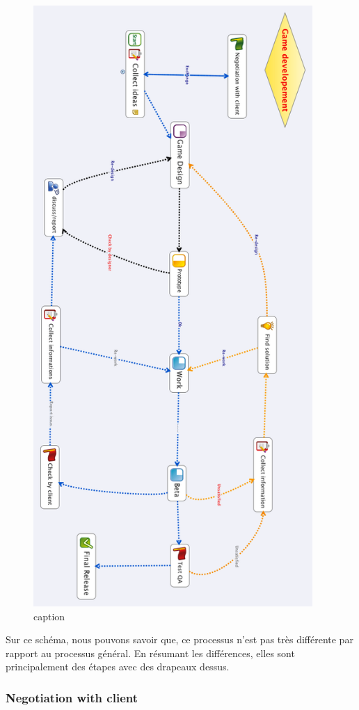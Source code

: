 \begin{figure}[htbp]
	\centering
		\includegraphics[height=9in]{XMinds/GamedevelopementChugulu.png}
	\caption{caption}
	\label{fig:XMinds_GamedevelopementChugulu}
\end{figure}


Sur ce schéma, nous pouvons savoir que, ce processus n'est pas très différente par rapport au processus général. En résumant les différences, elles sont principalement des étapes avec des drapeaux dessus. 

\subsubsection{Negotiation with client } %
\label{ssub:negotiation_with_client_}

